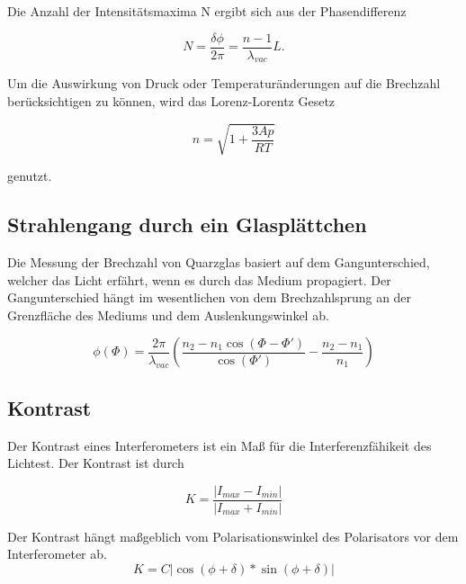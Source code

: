 Die Anzahl der Intensitätsmaxima N ergibt sich aus der Phasendifferenz

\begin{equation}
N=\frac{\delta \phi}{2 \pi} = \frac{n-1}{\lambda_{vac}} L.
\end{equation}

Um die Auswirkung von Druck oder Temperaturänderungen auf die Brechzahl berücksichtigen zu können, wird das Lorenz-Lorentz Gesetz

\begin{equation}
	n = \sqrt{1 + \frac{3Ap}{RT}}
\end{equation}

genutzt.

\subsection{Strahlengang durch ein Glasplättchen}


Die Messung der Brechzahl von Quarzglas basiert auf dem Gangunterschied, welcher das Licht erfährt, wenn es durch das Medium propagiert.
Der Gangunterschied hängt im wesentlichen von dem Brechzahlsprung an der Grenzfläche des Mediums und dem Auslenkungswinkel ab.

\begin{equation}
\phi(\Phi) = \frac{2 \pi}{\lambda_{vac}} \left( \frac{n_2 - n_1 \cos(\Phi - \Phi')}{\cos(\Phi')} - \frac{n_2 - n_1}{n_1}\right)
\end{equation}

\subsection{Kontrast}
Der Kontrast eines Interferometers ist ein Maß für die Interferenzfähikeit des Lichtest. Der Kontrast ist durch

\begin{equation}
K = \frac{|I_{max} - I_{min}|}{|I_{max} + I_{min}|}
\end{equation}

Der Kontrast hängt maßgeblich vom Polarisationswinkel des Polarisators vor dem Interferometer ab.
\begin{equation}
K = C|\cos(\phi + \delta) * \sin(\phi + \delta)|
\end{equation}
